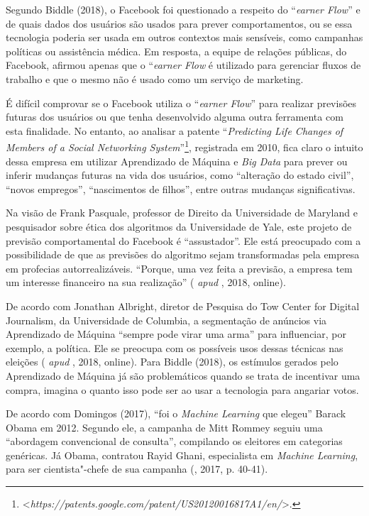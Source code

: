Segundo Biddle (2018), o Facebook foi questionado a respeito do
``\emph{earner Flow}'' e de quais dados dos usuários são usados para
prever comportamentos, ou se essa tecnologia poderia ser usada em outros
contextos mais sensíveis, como campanhas políticas ou assistência
médica. Em resposta, a equipe de relações públicas, do Facebook, afirmou
apenas que o ``\emph{earner Flow} é utilizado para gerenciar fluxos
de trabalho e que o mesmo não é usado como um serviço de marketing.

É difícil comprovar se o Facebook utiliza o ``\emph{earner Flow}''
para realizar previsões futuras dos usuários ou que tenha desenvolvido
alguma outra ferramenta com esta finalidade. No entanto, ao analisar a
patente ``\emph{Predicting Life Changes of Members of a Social
Networking System}''\footnote{\textless{}\emph{https://patents.google.com/patent/US20120016817A1/en/}\textgreater{}.},
registrada em 2010, fica claro o intuito dessa empresa em utilizar
Aprendizado de Máquina e \emph{Big Data} para prever ou inferir mudanças
futuras na vida dos usuários, como ``alteração do estado civil'',
``novos empregos'', ``nascimentos de filhos'', entre outras mudanças
significativas.

Na visão de Frank Pasquale, professor de Direito da Universidade de
Maryland e pesquisador sobre ética dos algoritmos da Universidade de
Yale, este projeto de previsão comportamental do Facebook é
``assustador''. Ele está preocupado com a possibilidade de que as
previsões do algoritmo sejam transformadas pela empresa em profecias
autorrealizáveis. ``Porque, uma vez feita a previsão, a empresa tem um
interesse financeiro na sua realização'' ( \emph{apud} , 2018,
online).

De acordo com Jonathan Albright, diretor de Pesquisa do Tow Center for
Digital Journalism, da Universidade de Columbia, a segmentação de
anúncios via Aprendizado de Máquina ``sempre pode virar uma arma'' para
influenciar, por exemplo, a política. Ele se preocupa com os possíveis
usos dessas técnicas nas eleições ( \emph{apud} , 2018, online).
Para Biddle (2018), os estímulos gerados pelo Aprendizado de Máquina já
são problemáticos quando se trata de incentivar uma compra, imagina o
quanto isso pode ser ao usar a tecnologia para angariar votos.

De acordo com Domingos (2017), ``foi o \emph{Machine Learning} que
elegeu'' Barack Obama em 2012. Segundo ele, a campanha de Mitt Rommey
seguiu uma ``abordagem convencional de consulta'', compilando os
eleitores em categorias genéricas. Já Obama, contratou Rayid Ghani,
especialista em \emph{Machine Learning}, para ser cientista"-chefe de sua
campanha (, 2017, p. 40-41).

